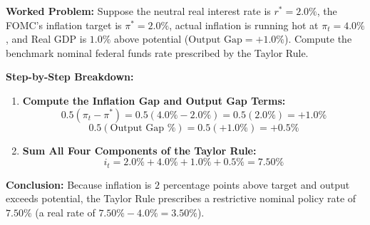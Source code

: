 \documentclass[11pt,letterpaper]{article}
\begin{document}
\noindent\textbf{Worked Problem:}
Suppose the neutral real interest rate is $r^* = 2.0\%$, the FOMC's inflation target is $\pi^* = 2.0\%$, actual inflation is running hot at $\pi_t = 4.0\%$, and Real GDP is $1.0\%$ above potential ($\text{Output Gap} = +1.0\%$). Compute the benchmark nominal federal funds rate prescribed by the Taylor Rule.

\noindent\textbf{Step-by-Step Breakdown:}
\begin{enumerate}
    \item \textbf{Compute the Inflation Gap and Output Gap Terms:}
    \[
    0.5(\pi_t - \pi^*) = 0.5(4.0\% - 2.0\%) = 0.5(2.0\%) = +1.0\%
    \]
    \[
    0.5(\text{Output Gap } \%) = 0.5(+1.0\%) = +0.5\%
    \]

    \item \textbf{Sum All Four Components of the Taylor Rule:}
    \[
    i_t = 2.0\% + 4.0\% + 1.0\% + 0.5\% = \mathbf{7.50\%}
    \]
\end{enumerate}
\textbf{Conclusion:} Because inflation is $2$ percentage points above target and output exceeds potential, the Taylor Rule prescribes a restrictive nominal policy rate of $7.50\%$ (a real rate of $7.50\% - 4.0\% = 3.50\%$).
\end{document}
